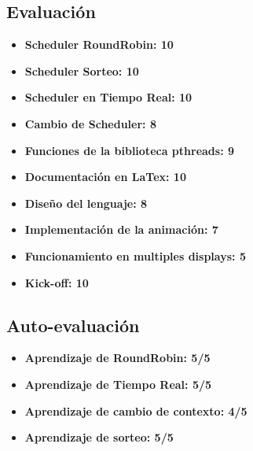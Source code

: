 \documentclass[12pt]{article}
\begin{document}
\subsection{Evaluación}
\begin{itemize}
    \item \textbf{Scheduler RoundRobin: 10}\\
    
    \item \textbf{Scheduler Sorteo: 10}\\

    \item \textbf{Scheduler en Tiempo Real: 10}\\
  
     \item \textbf{Cambio de Scheduler: 8}\\
    
     \item \textbf{Funciones de la biblioteca pthreads: 9}\\
   
     \item \textbf{Documentación en LaTex: 10}\\

     \item \textbf{Diseño del lenguaje: 8}\\

     \item \textbf{Implementación de la animación: 7}\\

     \item \textbf{Funcionamiento en multiples displays: 5}\\

    \item \textbf{Kick-off: 10}\\
\end{itemize}

\subsection{Auto-evaluación}
\begin{itemize}
    \item \textbf{Aprendizaje de RoundRobin: 5/5}\\

    \item \textbf{Aprendizaje de Tiempo Real: 5/5}\\
 
    \item \textbf{Aprendizaje de cambio de contexto:  4/5}\\

    \item \textbf{Aprendizaje de sorteo: 5/5}\\

\end{itemize}
\end{document}
